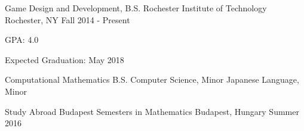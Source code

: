 


\begin{cventries}


\eduentry
{Game Design and Development, B.S.} %
{Rochester Institute of Technology} %
{Rochester, NY} %
{Fall 2014 - Present} %
{
\begin{cvitems}
\item GPA: 4.0
\item Expected Graduation: May 2018
\end{cvitems}
}
{Computational Mathematics B.S.}
{Computer Science, Minor}
{Japanese Language, Minor}

\eduentry
{Study Abroad} %
{Budapest Semesters in Mathematics} %
{Budapest, Hungary} %
{Summer 2016} %
{}
{}
{}
{}


\end{cventries}